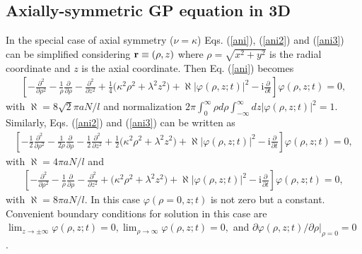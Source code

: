 \documentclass[onecolumn]{elsart3p}
\begin{document}
\subsection{Axially-symmetric GP equation in 3D}

In the special case of axial symmetry ($\nu = \kappa$) Eqs.
(\ref{ani}), (\ref{ani2}) and (\ref{ani3}) can be simplified considering
${\bf r}\equiv (\rho,z)$ where $\rho=\sqrt{x^2+y^2}$ is the radial
coordinate and $z$
is the axial coordinate. Then Eq. (\ref{ani}) becomes
\begin{align}
\left[
-\frac{\partial^2}{\partial  \rho^2}
-\frac{1}{\rho}\frac{\partial}{\partial  \rho}
-\frac{\partial^2}{\partial  z^2}
+\frac{1}{4} \biggr(\kappa^2 \rho^2+\lambda^2 z^2  \biggr)
+\aleph   %
\left\vert\varphi(\rho,z;t)\right\vert^2 - \mbox{i}
\frac{\partial}{\partial  t} \right]
\varphi(\rho,z;t)= 0,\label{axi}
 \end{align}
with $\aleph  %
=8\sqrt 2 \pi aN/l$ and normalization
$2\pi \int_{0}^{\infty}\rho d\rho
\int_{-\infty}^{\infty}dz
|\varphi(\rho,z;t)|^2 =1.$
Similarly, Eqs. (\ref{ani2}) and (\ref{ani3}) can be written as
\begin{eqnarray}
\left[
-\frac{1}{2}\frac{\partial^2}{\partial  \rho^2}
-\frac{1}{2\rho}\frac{\partial}{\partial  \rho}
-\frac{1}{2}\frac{\partial^2}{\partial  z^2}
+\frac{1}{2} \biggr(\kappa^2\rho^2+\lambda^2 z^2  \biggr)
+\aleph %
\left\vert\varphi(\rho,z;t)\right\vert^2 - \mbox{i}
\frac{\partial}{\partial
t} \right]
\varphi(\rho,z;t)= 0,\label{axi2}
\end{eqnarray}
with $\aleph  %
=4 \pi aN/l$ and
\begin{eqnarray}
\left[
-\frac{\partial^2}{\partial  \rho^2}
-\frac{1}{\rho}\frac{\partial}{\partial  \rho}
-\frac{\partial^2}{\partial  z^2}
+ \biggr(\kappa^2 \rho^2+\lambda^2 z^2  \biggr)
+\aleph  %
\left\vert\varphi(\rho,z;t)\right\vert^2 - \mbox{i}
\frac{\partial}{\partial
t} \right]
\varphi(\rho,z;t)= 0,\label{axi3}
\end{eqnarray}
with $\aleph   %
=8\pi aN/l$. In this case $\varphi(\rho=0,z;t)$ 
is not
zero but a constant.
Convenient boundary conditions for solution
in this case are $\lim_{z\to \pm \infty}\varphi(\rho,z;t)=0, \lim_{\rho\to
\infty}\varphi(\rho,z;t)=0,$ and 
$\partial \varphi(\rho,z;t)/\partial \rho|_{\rho=0}=0$
\cite{num4}.
\end{document}

